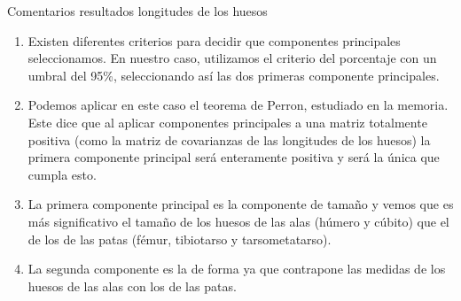 \documentclass{beamer}
\begin{document}
\begin{frame}{Comentarios resultados longitudes de los huesos}
\begin{footnotesize}
\begin{enumerate}
\color{red}
    \item Existen diferentes criterios para decidir que componentes principales seleccionamos. En nuestro caso, utilizamos el criterio del porcentaje con un umbral del 95\%, seleccionando así las dos primeras componente principales.
    \item Podemos aplicar en este caso el teorema de Perron, estudiado en la memoria. Este dice que al aplicar componentes principales a una matriz totalmente positiva (como la matriz de covarianzas de las longitudes de los huesos) la primera componente principal será enteramente positiva y será la única que cumpla esto.
    \item La primera componente principal es la componente de tamaño y vemos que es más significativo el tamaño de los huesos de las alas (húmero y cúbito) que el de los de las patas (fémur, tibiotarso y tarsometatarso).
    \item La segunda componente es la de forma ya que contrapone las medidas de los huesos de las alas con los de las patas.
\end{enumerate}
\end{footnotesize}
    
\end{frame}
\end{document}
